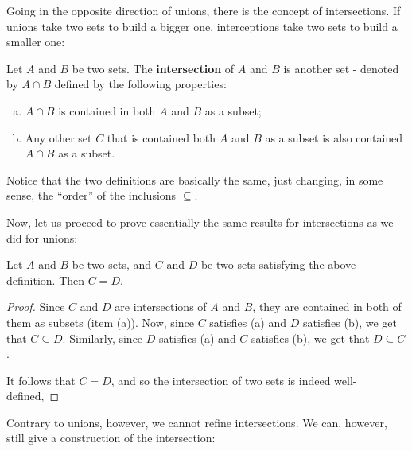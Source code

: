 \bigskip
Going in the opposite direction of unions, there is the concept of intersections. If unions take two sets to build a bigger one, interceptions take two sets to build a smaller one:

\begin{df}
		Let $A$ and $B$ be two sets. The \textbf{intersection} of $A$ and $B$ is another set - denoted by $A\cap B$ defined by the following properties:
	\begin{enumerate}[(a)]
		\item $A\cap B$ is contained in both $A$ and $B$ as a subset;
		\item Any other set $C$ that is contained both $A$ and $B$ as a subset is also contained $A\cap B$ as a subset.
	\end{enumerate}
\end{df}

\begin{rmk}
	Notice that the two definitions are basically the same, just changing, in some sense, the ``order'' of the inclusions $\subseteq$.
\end{rmk}

Now, let us proceed to prove essentially the same results for intersections as we did for unions:

\begin{lemma}
	Let $A$ and $B$ be two sets, and $C$ and $D$ be two sets satisfying the above definition. Then $C=D$.
\end{lemma}
\begin{proof}
	Since $C$ and $D$ are intersections of $A$ and $B$, they are contained in both of them as subsets (item (a)). Now, since $C$ satisfies (a) and $D$ satisfies (b), we get that $C\subseteq D$. Similarly, since $D$ satisfies (a) and $C$ satisfies (b), we get that $D\subseteq C$.
	
	It follows that $C=D$, and so the intersection of two sets is indeed well-defined,
\end{proof}

Contrary to unions, however, we cannot refine intersections. We can, however, still give a construction of the intersection:

